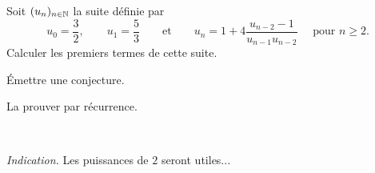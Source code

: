 \begin{frame}
\begin{tp}
Soit $(u_n)_{n \in \mathbb{N}}$ la suite définie par 
$$u_0 = \frac32, \qquad u_1 = \frac53 \qquad \mbox{et} \qquad u_n = 1 + 4\frac{u_{n-2}-1}{u_{n-1}u_{n-2}}
\quad \text{ pour } n\ge 2.$$
Calculer les premiers termes de cette suite. 

\'Emettre une conjecture.
 
La prouver par récurrence.

~

\emph{Indication.} Les puissances de $2$ seront utiles...
\end{tp}
\end{frame}


